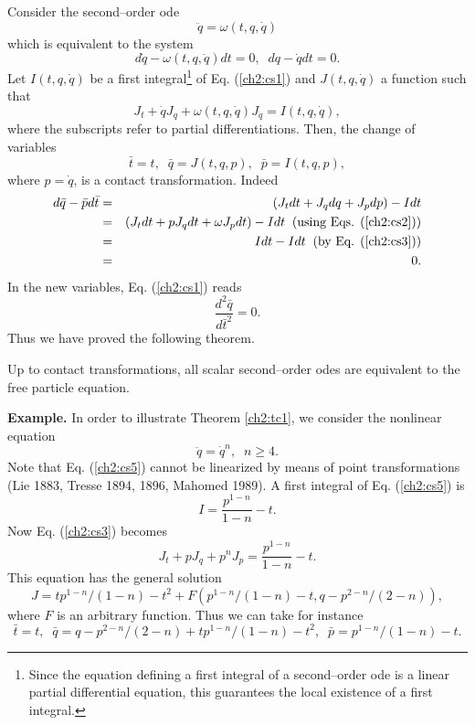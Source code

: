 Consider the second--order ode
\begin{equation}
\label{ch2:cs1}
\ddot q=\omega (t,q,\dot q)
\end{equation}
which is equivalent to the system
\begin{equation}
\label{ch2:cs2}
d\dot q-\omega (t,q,\dot q)dt =0,\;\; dq-\dot q dt=0.
\end{equation}
Let $I(t,q,\dot q)$ be a first integral\footnote{Since the equation defining
a first integral of a second--order ode
is a linear partial differential equation, this guarantees the local
existence of a  first integral.}   of Eq. (\ref{ch2:cs1}) and
$J(t,q,\dot q)$ a function  such that
\begin{equation}
\label{ch2:cs3}
J_t+\dot q J_q+\omega (t,q,\dot q)J_{\dot q}=I(t,q,\dot q),
\end{equation}
where the subscripts refer to partial differentiations. Then, the change  of
variables
\begin{equation}
\label{ch2:cs4}
\bar t =t,\;\; \bar q= J(t,q,p),\;\;\bar p=I(t,q,p),
\end{equation}
where $p=\dot q$, is a contact transformation. Indeed
\begin{eqnarray*}
d\bar q-\bar p d\bar t &= & ( J_t dt+J_q dq+ J_pdp)-Idt \\
&=& (J_t dt+pJ_qdt+\omega J_pdt )-Idt\;\;(\mbox{using Eqs. (\ref{ch2:cs2})} )\\
&=& I dt-Idt\;\; (\mbox{by Eq. (\ref{ch2:cs3})})\\
&=& 0.
\end{eqnarray*}
In the new variables, Eq. (\ref{ch2:cs1}) reads
\[ \frac{d^2\bar q}{d {\bar t}^2}=0.\]
Thus we have proved the following theorem.
\begin{theo}
\label{ch2:tc1}
\begin{em}
Up to contact transformations, all scalar second--order odes are equivalent
to the free particle equation.
\end{em}
\end{theo}
{\bf Example.} In order to illustrate Theorem \ref{ch2:tc1}, we consider the
nonlinear equation
\begin{equation}
\label{ch2:cs5}
\ddot q={\dot q}^n,\;\; n\ge 4 .
\end{equation}
Note that Eq. (\ref{ch2:cs5}) cannot be linearized by means of point
transformations (Lie 1883, Tresse 1894, 1896, Mahomed 1989). A first
integral of Eq. (\ref{ch2:cs5}) is
\[I=\frac{p^{1-n}}{1-n}-t. \]
Now Eq. (\ref{ch2:cs3}) becomes
\[J_t+p J_q+p^n J_p=\frac{p^{1-n}}{1-n}-t.\]
This equation has the general solution
\[ J=  tp^{1-n}/(1-n)-t^2 +F\left (p^{1-n}/(1-n)-t,q-p^{2-n}/(2-n)\right ),\]
where $F$ is an arbitrary function. Thus we can take for instance
\[ \bar t=t,\;\; \bar q =q-p^{2-n}/(2-n)+tp^{1-n}/(1-n)-t^2,\;\;
\bar p=p^{1-n}/(1-n)-t.\]


